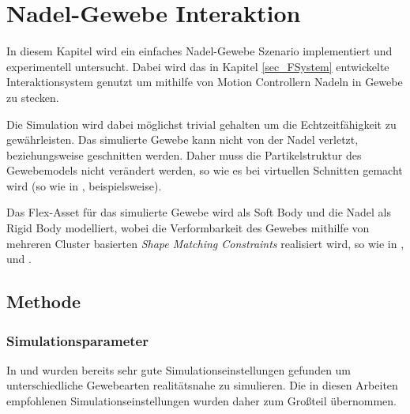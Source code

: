 \section{Nadel-Gewebe Interaktion}%
\label{sec_needle}


In diesem Kapitel wird ein einfaches Nadel-Gewebe Szenario implementiert und experimentell untersucht. Dabei wird das in Kapitel \ref{sec_FSystem} entwickelte Interaktionsystem genutzt um mithilfe von Motion Controllern Nadeln in Gewebe zu stecken. 

Die Simulation wird dabei möglichst trivial gehalten um die Echtzeitfähigkeit zu gewährleisten. Das simulierte Gewebe kann nicht von der Nadel verletzt, beziehungsweise geschnitten werden. Daher muss die Partikelstruktur des Gewebemodels nicht verändert werden, so wie es bei virtuellen Schnitten gemacht wird (so wie in \cite{PBDCutting}, beispielsweise).

Das Flex-Asset für das simulierte Gewebe wird als Soft Body und die Nadel als Rigid Body modelliert, wobei die Verformbarkeit des Gewebes mithilfe von mehreren Cluster basierten \textit{Shape Matching Constraints} realisiert wird, so wie in \cite{UPP}, \cite{BreastBiopsy} und \cite{PBDKidney}. 


\subsection{Methode}
\subsubsection{Simulationsparameter}    

In \cite{PBDKidney} und \cite{BreastBiopsy} wurden bereits sehr gute Simulationseinstellungen gefunden um unterschiedliche Gewebearten realitätsnahe zu simulieren. Die in diesen Arbeiten empfohlenen Simulationseinstellungen wurden daher zum Großteil übernommen.

